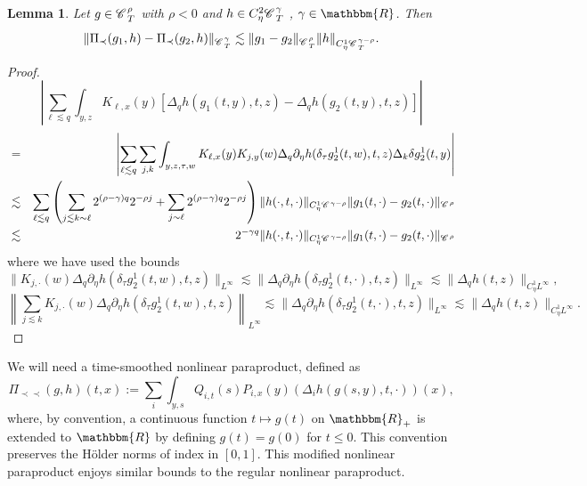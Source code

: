 \documentclass[11pt,reqno]{amsart}
\newcommand{\assign}{:=}
\newcommand{\cdummy}{\cdot}
\newcommand{\precprec}{\prec\!\!\!\prec}
\newtheorem{lemma}[theorem]{Lemma}
\newcommand{\CC}{\mathscr{C} \hspace{.1em}}
\begin{document}
\begin{lemma}
  \label{l:other-decomp-est}Let $g \in \CC_T^{\rho}$ with $\rho < 0$ and $h
  \in C^2_{\eta} \CC_T^{\gamma}$ , $\gamma \in \mathbbm{R}$. Then
  \[ \| \Pi_{\prec} (g_1, h) - \Pi_{\prec} (g_2, h) \|_{\CC^{\gamma}_T}
     \lesssim \| g_1 - g_2 \|_{\CC^{\rho}_T} \| h \|_{C_{\eta}^1 \CC^{\gamma -
     \rho}_T} . \]
\end{lemma}

\begin{proof}
  
  \[ \left| \sum_{\ell \lesssim q} \int_{y, z} K_{\ell, x} (y) [\Delta_q h
     (g_1 (t, y), t, z) - \Delta_q h (g_2 (t, y), t, z)] \right| \]
  \begin{eqnarray*}
    & = & \left| \sum_{\ell \lesssim q} \sum_{j, k} \int_{y, z, \tau, w}
    K_{\ell, x} (y) K_{j, y} (w) \Delta_q \partial_{\eta} h (\delta_{\tau}
    g^1_2 (t, w), t, z) \Delta_k \delta g^1_2 (t, y) \right|\\
    & \lesssim & \sum_{\ell \lesssim q} \left( \sum_{j \lesssim k \sim \ell}
    2^{(\rho - \gamma) q} 2^{- \rho j} + \sum_{j \sim \ell} 2^{(\rho - \gamma)
    q} 2^{- \rho j} \right) \| h (\cdummy, t, \cdummy) \|_{C_{\eta}^1
    \CC^{\gamma - \rho}} \| g_1 (t, \cdummy) - g_2 (t, \cdummy)
    \|_{\CC^{\rho}}\\
    & \lesssim & 2^{- \gamma q} \| h (\cdummy, t, \cdummy) \|_{C_{\eta}^1
    \CC^{\gamma - \rho}} \| g_1 (t, \cdummy) - g_2 (t, \cdummy)
    \|_{\CC^{\rho}}
  \end{eqnarray*}
  where we have used the bounds
  \[ \| K_{j, \cdummy} (w) \Delta_q \partial_{\eta} h (\delta_{\tau} g^1_2 (t,
     w), t, z) \|_{L^{\infty}} \lesssim \| \Delta_q \partial_{\eta} h
     (\delta_{\tau} g^1_2 (t, \cdummy), t, z) \|_{L^{\infty}} \lesssim \|
     \Delta_q h (t, z) \|_{C_{\eta}^1 L^{\infty}}, \]
  \[ \left\| \sum_{j \lesssim k} K_{j, \cdummy} (w) \Delta_q \partial_{\eta} h
     (\delta_{\tau} g^1_2 (t, w), t, z) \right\|_{L^{\infty}} \lesssim \|
     \Delta_q \partial_{\eta} h (\delta_{\tau} g^1_2 (t, \cdummy), t, z)
     \|_{L^{\infty}} \lesssim \| \Delta_q h (t, z) \|_{C_{\eta}^1 L^{\infty}}
     . \]
\end{proof}

We will need a time-smoothed nonlinear paraproduct, defined as
\begin{equation}
  \Pi_{\precprec} (g, h) (t, x) \assign \sum_i \int_{y, s} Q_{i, t} (s) P_{i,
  x} (y) (\Delta_i h (g (s, y), t, \cdot)) (x), \label{e:def-nonlinear}
\end{equation}
where, by convention, a continuous function $t \mapsto g (t)$ on
$\mathbbm{R}_+$ is extended to $\mathbbm{R}$ by defining $g (t) = g (0)$ for
$t \leqslant 0$. This convention preserves the H{\"o}lder norms of index in
$[0, 1]$. This modified nonlinear paraproduct enjoys similar bounds to the
regular nonlinear paraproduct.
\end{document}
